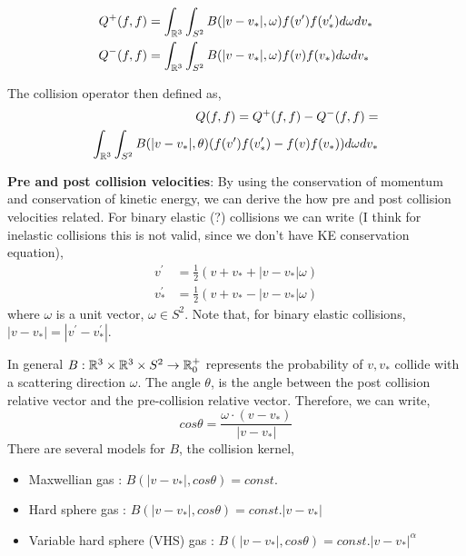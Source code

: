 \documentclass{article}
\begin{document}
\begin{align}
    Q^{+}(f,f) &= \int_{\mathbb{R}^3}\int_{S^2} B(|v-v_*|,\omega) f(v^\prime)f(v_*^\prime) d\omega dv_* \\
    Q^{-}(f,f) &= \int_{\mathbb{R}^3}\int_{S^2} B(|v-v_*|,\omega) f(v)f(v_*) d\omega dv_* 
\end{align}

The collision operator then defined as, 
\begin{equation}
    \begin{split}
        Q(f,f) = Q^{+}(f,f) - Q^{-}(f,f) = \\ \int_{\mathbb{R}^3}\int_{S^2} B(|v-v_*|,\theta)(f(v^\prime)f(v_*^\prime) - f(v)f(v_*) ) d\omega dv_*    
    \end{split}
\end{equation}

\textbf{Pre and post collision velocities}: By using the conservation of momentum and conservation of kinetic energy, we can derive the how pre and post collision velocities related. For binary elastic (?) collisions we can write (I think for inelastic collisions this is not valid, since we don't have KE conservation equation), 
\begin{align}
    v^\prime  &= \frac{1}{2} (v + v_* + |v-v_*| \omega) \\
    v_*^\prime  &= \frac{1}{2} (v + v_* - |v-v_*| \omega)
\end{align} where $\omega$ is a unit vector, $\omega \in S^2$. Note that, for binary elastic collisions, $|v-v_*| = |v^\prime-v_*^\prime|$.

In general $B : \mathbb{R}^3 \times \mathbb{R}^3 \times S^2 \rightarrow \mathbb{R}_{0}^+$ represents the probability of $v,v_*$ collide with a scattering direction $\omega$. The angle $\theta$, is the angle between the post collision relative vector and the pre-collision relative vector. Therefore, we can write, 
\begin{equation}
    cos\theta = \frac{\omega \cdot (v-v_*)}{|v-v_*|}
\end{equation}
There are several models for $B$, the collision kernel,
\begin{itemize}
    \item Maxwellian gas : $B(|v-v_*|,cos\theta) = const.$
    \item Hard sphere gas : $B(|v-v_*|,cos\theta) = const.|v-v_*|$
    \item Variable hard sphere (VHS) gas : $B(|v-v_*|,cos\theta) = const. |v-v_*|^\alpha$
\end{itemize}
\end{document}
